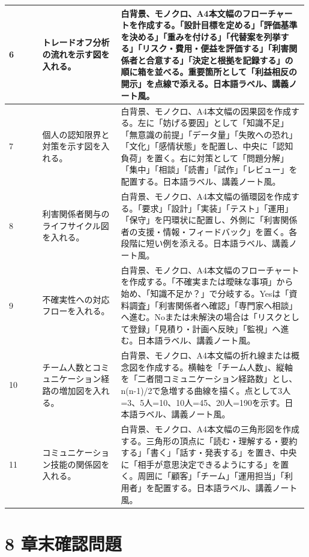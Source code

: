 \documentclass[uplatex,dvipdfmx,a4paper,11pt]{jsarticle}
\begin{document}
\begin{center}
\begin{longtable}{p{0.11\linewidth}p{0.26\linewidth}p{0.62\linewidth}}
\midrule
6 & トレードオフ分析の流れを示す図を入れる。 & 白背景、モノクロ、A4本文幅のフローチャートを作成する。「設計目標を定める」「評価基準を決める」「重みを付ける」「代替案を列挙する」「リスク・費用・便益を評価する」「利害関係者と合意する」「決定と根拠を記録する」の順に箱を並べる。重要箇所として「利益相反の開示」を点線で添える。日本語ラベル、講義ノート風。 \\
\midrule
7 & 個人の認知限界と対策を示す図を入れる。 & 白背景、モノクロ、A4本文幅の因果図を作成する。左に「妨げる要因」として「知識不足」「無意識の前提」「データ量」「失敗への恐れ」「文化」「感情状態」を配置し、中央に「認知負荷」を置く。右に対策として「問題分解」「集中」「相談」「読書」「試作」「レビュー」を配置する。日本語ラベル、講義ノート風。 \\
\midrule
8 & 利害関係者関与のライフサイクル図を入れる。 & 白背景、モノクロ、A4本文幅の循環図を作成する。「要求」「設計」「実装」「テスト」「運用」「保守」を円環状に配置し、外側に「利害関係者の支援・情報・フィードバック」を置く。各段階に短い例を添える。日本語ラベル、講義ノート風。 \\
\midrule
9 & 不確実性への対応フローを入れる。 & 白背景、モノクロ、A4本文幅のフローチャートを作成する。「不確実または曖昧な事項」から始め、「知識不足か？」で分岐する。Yesは「資料調査」「利害関係者へ確認」「専門家へ相談」へ進む。Noまたは未解決の場合は「リスクとして登録」「見積り・計画へ反映」「監視」へ進む。日本語ラベル、講義ノート風。 \\
\midrule
10 & チーム人数とコミュニケーション経路の増加図を入れる。 & 白背景、モノクロ、A4本文幅の折れ線または概念図を作成する。横軸を「チーム人数」、縦軸を「二者間コミュニケーション経路数」とし、n(n-1)/2で急増する曲線を描く。点として3人=3、5人=10、10人=45、20人=190を示す。日本語ラベル、講義ノート風。 \\
\midrule
11 & コミュニケーション技能の関係図を入れる。 & 白背景、モノクロ、A4本文幅の三角形図を作成する。三角形の頂点に「読む・理解する・要約する」「書く」「話す・発表する」を置き、中央に「相手が意思決定できるようにする」を置く。周囲に「顧客」「チーム」「運用担当」「利用者」を配置する。日本語ラベル、講義ノート風。 \\
\midrule
\bottomrule
\end{longtable}
\normalsize
\end{center}

\section*{8 章末確認問題}
\end{document}
